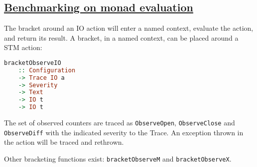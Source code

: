 

\pagecolor{columbiablue!50}




\begin{mdframed}
    \section*{\href{https://github.com/The-Blockchain-Company/tbco-monitoring-framework/blob/master/tbco-monitoring/src/Bcc/BM/Observer/Monadic.lhs}{Benchmarking on monad evaluation}}

The bracket around an IO action will enter a named context, evaluate the action, and return its result. A bracket, in a named context, can be placed around a STM action:

    \begin{lstlisting}[language=Haskell]
bracketObserveIO
    :: Configuration
    -> Trace IO a
    -> Severity
    -> Text
    -> IO t
    -> IO t
    \end{lstlisting}

The set of observed counters are traced as \texttt{ObserveOpen}, \texttt{ObserveClose} and \texttt{ObserveDiff} with the indicated severity to the Trace. An exception thrown in the action will be traced and rethrown.

Other bracketing functions exist: \texttt{bracketObserveM} and \texttt{bracketObserveX}.
\end{mdframed}

